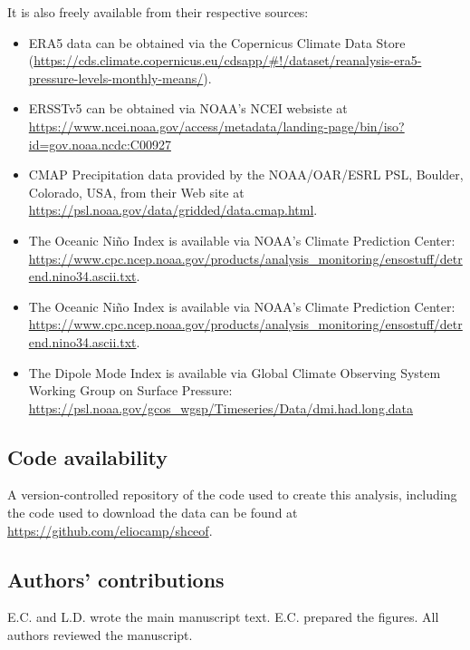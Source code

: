 \documentclass[pdflatex,sn-basic]{sn-jnl}
\theoremstyle{thmstyleone}%
\theoremstyle{thmstyletwo}%
\theoremstyle{thmstylethree}%
\begin{document}
It is also freely available from their respective sources:

\begin{itemize}
\item
  ERA5 data can be obtained via the Copernicus Climate Data Store (\url{https://cds.climate.copernicus.eu/cdsapp/\#!/dataset/reanalysis-era5-pressure-levels-monthly-means/}).
\item
  ERSSTv5 can be obtained via NOAA's NCEI websiste at \url{https://www.ncei.noaa.gov/access/metadata/landing-page/bin/iso?id=gov.noaa.ncdc:C00927}
\item
  CMAP Precipitation data provided by the NOAA/OAR/ESRL PSL, Boulder, Colorado, USA, from their Web site at \url{https://psl.noaa.gov/data/gridded/data.cmap.html}.
\item
  The Oceanic Niño Index is available via NOAA's Climate Prediction Center: \url{https://www.cpc.ncep.noaa.gov/products/analysis_monitoring/ensostuff/detrend.nino34.ascii.txt}.
\item
  The Oceanic Niño Index is available via NOAA's Climate Prediction Center: \url{https://www.cpc.ncep.noaa.gov/products/analysis_monitoring/ensostuff/detrend.nino34.ascii.txt}.
\item
  The Dipole Mode Index is available via Global Climate Observing System Working Group on Surface Pressure: \url{https://psl.noaa.gov/gcos_wgsp/Timeseries/Data/dmi.had.long.data}
\end{itemize}

\hypertarget{code-availability}{%
\subsection*{Code availability}\label{code-availability}}

A version-controlled repository of the code used to create this analysis, including the code used to download the data can be found at \url{https://github.com/eliocamp/shceof}.

\hypertarget{authors-contributions}{%
\subsection*{Authors' contributions}\label{authors-contributions}}

E.C. and L.D. wrote the main manuscript text. E.C. prepared the figures. All authors reviewed the manuscript.
\end{document}
